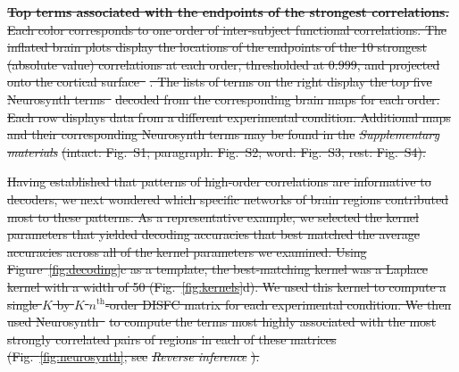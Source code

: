 \documentclass[english]{article}
\newcommand{\intact}{S1}
\newcommand{\para}{S2}
\newcommand{\word}{S3}
\newcommand{\rest}{S4}
\providecommand{\DIFdeltex}[1]{{\protect\color{red}\sout{#1}}}                      %
\providecommand{\DIFdelFL}[1]{\DIFdel{#1}} %
\providecommand{\DIFdel}[1]{\texorpdfstring{\DIFdeltex{#1}}{}} %
\begin{document}
{%
\textbf{\DIFdelFL{Top terms associated with the endpoints of the
      strongest correlations.}}  %
\DIFdelFL{Each color corresponds to one order of
    inter-subject functional correlations. The inflated brain plots
    display the locations of the endpoints of the 10 strongest
    (absolute value) correlations at each order, thresholded at 0.999,
    and projected onto the cortical surface~}%
\DIFdelFL{.  The
    lists of terms on the right display the top five Neurosynth
    terms~}%
\DIFdelFL{decoded from the corresponding brain maps
    for each order.  Each row displays data from a different
    experimental condition.  Additional maps and their corresponding
    Neurosynth terms may be found in the }\textit{\DIFdelFL{Supplementary
      materials}} %
\DIFdelFL{(intact: Fig.~\intact; paragraph: Fig.~\para; word:
    Fig.~\word; rest: Fig.~\rest).}}

\DIFdel{Having established that patterns of high-order correlations are
informative to decoders, we next wondered which specific networks of
brain regions contributed most to these patterns.  As a representative
example, we selected the kernel parameters that yielded decoding
accuracies that best matched the average accuracies across all of the
kernel parameters we examined.  Using Figure~\ref{fig:decoding}c as a
template, the best-matching kernel was a Laplace kernel with a width
of 50 (Fig.~\ref{fig:kernels}d).  We used this kernel to compute a
single $K$ by $K$ $n^\mathrm{th}$-order DISFC matrix for each
experimental condition.  We then used Neurosynth~}%
\DIFdel{to
compute the terms most highly associated with the most strongly
correlated pairs of regions in each of these matrices
(Fig.~\ref{fig:neurosynth}; see }\textit{\DIFdel{Reverse inference}}%
\DIFdel{).
}%
\end{document}
